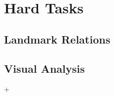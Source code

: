 \section*{Hard Tasks}

\subsection*{Landmark Relations}

\todo{}

\subsection*{Visual Analysis}

\todo{}

+

